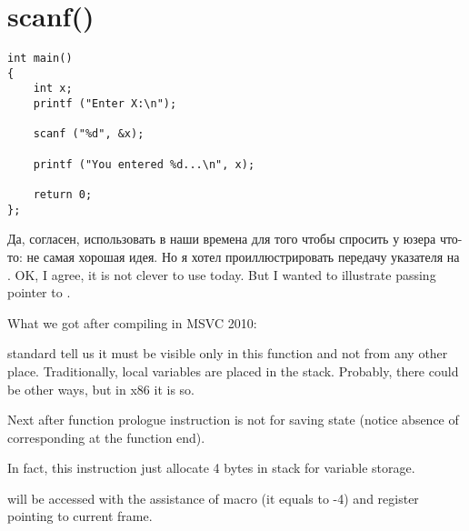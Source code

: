 ﻿\section{scanf()}


\begin{lstlisting}
int main() 
{
	int x;
	printf ("Enter X:\n");

	scanf ("%d", &x);

	printf ("You entered %d...\n", x);

	return 0;
};
\end{lstlisting}

\IFRU
{Да, согласен, использовать \scanf в наши времена для того чтобы спросить у юзера что-то: не самая хорошая идея.
Но я хотел проиллюстрировать передачу указателя на \Tint.}
{OK, I agree, it is not clever to use \scanf today. But I wanted to illustrate passing pointer to \Tint.}

{What we got after compiling in MSVC 2010:}




{\CCpp standard tell us it must be visible only in this function and not from any other place. 
Traditionally, local variables are placed in the stack. 
Probably, there could be other ways, but in x86 it is so.}

{Next after function prologue instruction  is not for saving \ECX state 
(notice absence of corresponding  at the function end).}

{In fact, this instruction just allocate 4 bytes in stack for  variable storage.} 

{ will be accessed with the assistance of  macro 
(it equals to -4) and \EBP register pointing to current frame.}

